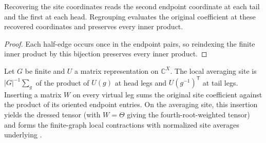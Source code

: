 \begin{lemma}%
    \label{thm:peps_graph_physical_bond_coordinates}
    \leanok
    Recovering the site coordinates reads the second endpoint coordinate at
    each tail and the first at each head. Regrouping evaluates the original
    coefficient at these recovered coordinates and preserves every inner product.
\end{lemma}
\begin{proof}\leanok
    Each half-edge occurs once in the endpoint pairs, so reindexing the finite
    inner product by this bijection preserves every inner product.
\end{proof}

\begin{definition}%
    \label{def:peps_graph_weighted_averaging_site}
    \leanok
    Let $G$ be finite and $U$ a matrix representation on $\mathbb C^X$.
    The local averaging site is $|G|^{-1}\sum_g$ of the product of
    $U(g)$ at head legs and $U(g^{-1})^{\mathsf T}$ at tail legs.
    Inserting a matrix $W$ on every virtual leg sums the original
    site coefficient against the product of its oriented endpoint entries.
    On the averaging site, this insertion yields the dressed tensor
    (with $W=\Theta$ giving the fourth-root-weighted tensor) and forms
    the finite-graph local contractions with normalized site averages
    underlying \cite[Section~7]{Schuch2010PEPS}.
\end{definition}

